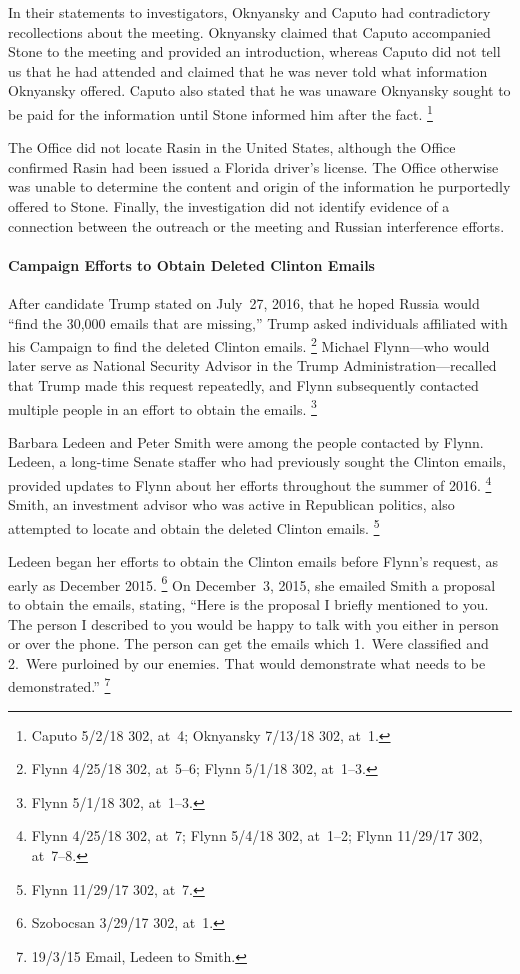 In their statements to investigators, Oknyansky and Caputo had contradictory recollections about the meeting.
Oknyansky claimed that Caputo accompanied Stone to the meeting and provided an introduction, whereas Caputo did not tell us that he had attended and claimed that he was never told what information Oknyansky offered.
Caputo also stated that he was unaware Oknyansky sought to be paid for the information until Stone informed him after the fact.%
\footnote{Caputo 5/2/18 302, at~4;
Oknyansky 7/13/18 302, at~1.}

The Office did not locate Rasin in the United States, although the Office confirmed Rasin had been issued a  Florida driver's license.
The Office otherwise was unable to determine the content and origin of the information he purportedly offered to Stone.
Finally, the investigation did not identify evidence of a connection between the outreach or the meeting and Russian interference efforts.

\paragraph{Campaign Efforts to Obtain Deleted Clinton Emails}

After candidate Trump stated on July~27, 2016, that he hoped Russia would ``find the 30,000 emails that are missing,'' Trump asked individuals affiliated with his Campaign to find the deleted Clinton emails.%
\footnote{Flynn 4/25/18 302, at~5--6;
Flynn 5/1/18 302, at~1--3.}
Michael Flynn---who would later serve as National Security Advisor in the Trump Administration---recalled that Trump made this request repeatedly, and Flynn subsequently contacted multiple people in an effort to obtain the emails.%
\footnote{Flynn 5/1/18 302, at~1--3.}

Barbara Ledeen and Peter Smith were among the people contacted by Flynn.
Ledeen, a long-time Senate staffer who had previously sought the Clinton emails, provided updates to Flynn about her efforts throughout the summer of 2016.%
\footnote{ Flynn 4/25/18 302, at~7; Flynn 5/4/18 302, at~1--2; Flynn 11/29/17 302, at~7--8.}
Smith, an investment advisor who was active in Republican politics, also attempted to locate and obtain the deleted Clinton emails.%
\footnote{ Flynn 11/29/17 302, at~7.}

Ledeen began her efforts to obtain the Clinton emails before Flynn's request, as early as December 2015.%
\footnote{Szobocsan 3/29/17 302, at~1.}
On December~3, 2015, she emailed Smith a proposal to obtain the emails, stating, ``Here is the proposal I briefly mentioned to you.
The person I described to you would be happy to talk with you either in person or over the phone.
The person can get the emails which 1.~Were classified and 2.~Were purloined by our enemies.
That would demonstrate what needs to be demonstrated.''%
\footnote{19/3/15 Email, Ledeen to Smith.}

